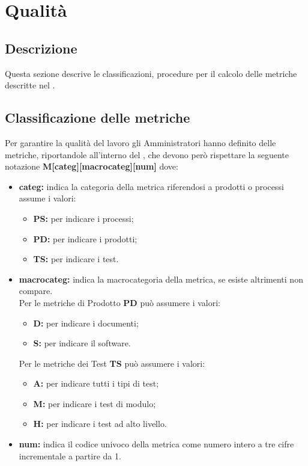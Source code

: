\documentclass[NormeDiProgetto.tex]{subfiles}
\begin{document}
	
	\section{Qualità}
	\subsection{Descrizione}
	Questa sezione descrive le classificazioni, procedure per il calcolo delle metriche descritte nel \pdq{}.
	
	\subsection{Classificazione delle metriche}
	Per garantire la qualità del lavoro gli Amministratori hanno definito delle metriche, riportandole all'interno del \pdq{}, che devono però rispettare la seguente notazione \textbf{M[categ][macrocateg][num]}	dove:
	\begin{itemize}
		\item \textbf{categ:} indica la categoria della metrica riferendosi a prodotti o processi assume i valori:
		\begin{itemize}
			\item \textbf{PS:} per indicare i processi;
			\item \textbf{PD:} per indicare i prodotti;
			\item \textbf{TS:} per indicare i test.
		\end{itemize}
		\item \textbf{macrocateg:} indica la macrocategoria della metrica, se esiste altrimenti non compare.\\
		Per le metriche di Prodotto \textbf{PD} può assumere i valori:
		\begin{itemize}
			\item \textbf{D:} per indicare i documenti;
			\item \textbf{S:} per indicare il software.
		\end{itemize}
		Per le metriche dei Test \textbf{TS} può assumere i valori:
		\begin{itemize}
			\item \textbf{A:} per indicare tutti i tipi di test;
			\item \textbf{M:} per indicare i test di modulo;
			\item \textbf{H:} per indicare i test ad alto livello.		
		\end{itemize}
		\item \textbf{num:} indica il codice univoco della metrica come numero intero a tre cifre incrementale a partire da 1.
	\end{itemize}	
	
\end{document}
